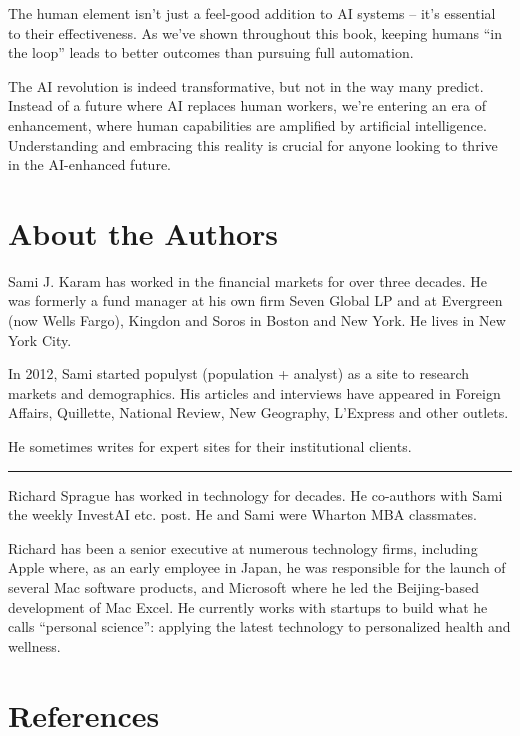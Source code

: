 \documentclass[
  Letterpaper,
]{scrbook}
\begin{document}
The human element isn't just a feel-good addition to AI systems -- it's
essential to their effectiveness. As we've shown throughout this book,
keeping humans ``in the loop'' leads to better outcomes than pursuing
full automation.

The AI revolution is indeed transformative, but not in the way many
predict. Instead of a future where AI replaces human workers, we're
entering an era of enhancement, where human capabilities are amplified
by artificial intelligence. Understanding and embracing this reality is
crucial for anyone looking to thrive in the AI-enhanced future.


\chapter{About the Authors}\label{about-the-authors}

Sami J. Karam has worked in the financial markets for over three
decades. He was formerly a fund manager at his own firm Seven Global LP
and at Evergreen (now Wells Fargo), Kingdon and Soros in Boston and New
York. He lives in New York City.

In 2012, Sami started populyst (population + analyst) as a site to
research markets and demographics. His articles and interviews have
appeared in Foreign Affairs, Quillette, National Review, New Geography,
L'Express and other outlets.

He sometimes writes for expert sites for their institutional clients.

\begin{center}\rule{0.5\linewidth}{0.5pt}\end{center}

Richard Sprague has worked in technology for decades. He co-authors with
Sami the weekly InvestAI etc. post. He and Sami were Wharton MBA
classmates.

Richard has been a senior executive at numerous technology firms,
including Apple where, as an early employee in Japan, he was responsible
for the launch of several Mac software products, and Microsoft where he
led the Beijing-based development of Mac Excel. He currently works with
startups to build what he calls ``personal science'': applying the
latest technology to personalized health and wellness.


\chapter*{References}\label{references}
\end{document}
